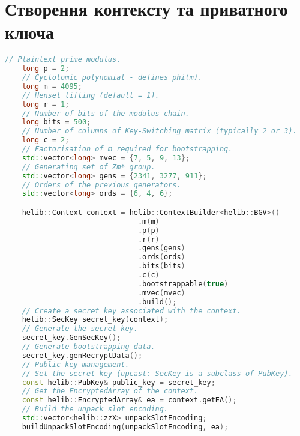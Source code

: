 \chapter{Створення контексту та приватного ключа}
\label{appendix:b}
\small
\begin{lstlisting}[language=c++, tabsize=1]
    // Plaintext prime modulus.
    long p = 2;
    // Cyclotomic polynomial - defines phi(m).
    long m = 4095;
    // Hensel lifting (default = 1).
    long r = 1;
    // Number of bits of the modulus chain.
    long bits = 500;
    // Number of columns of Key-Switching matrix (typically 2 or 3).
    long c = 2;
    // Factorisation of m required for bootstrapping.
    std::vector<long> mvec = {7, 5, 9, 13};
    // Generating set of Zm* group.
    std::vector<long> gens = {2341, 3277, 911};
    // Orders of the previous generators.
    std::vector<long> ords = {6, 4, 6};

    helib::Context context = helib::ContextBuilder<helib::BGV>()
                               .m(m)
                               .p(p)
                               .r(r)
                               .gens(gens)
                               .ords(ords)
                               .bits(bits)
                               .c(c)
                               .bootstrappable(true)
                               .mvec(mvec)
                               .build();
    // Create a secret key associated with the context.
    helib::SecKey secret_key(context);
    // Generate the secret key.
    secret_key.GenSecKey();
    // Generate bootstrapping data.
    secret_key.genRecryptData();
    // Public key management.
    // Set the secret key (upcast: SecKey is a subclass of PubKey).
    const helib::PubKey& public_key = secret_key;
    // Get the EncryptedArray of the context.
    const helib::EncryptedArray& ea = context.getEA();
    // Build the unpack slot encoding.
    std::vector<helib::zzX> unpackSlotEncoding;
    buildUnpackSlotEncoding(unpackSlotEncoding, ea);
\end{lstlisting}
\par

